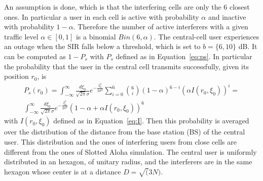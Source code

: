 \documentclass[10pt]{article}
\begin{document}
An assumption is done, which is that the interfering cells are only the 6 closest ones. In particular a user in each cell is active with probability $\alpha$ and inactive with probability $1-\alpha$. Therefore the number of active interferers with a given traffic level $\alpha \in [0,1]$ is a binomial $Bin(6, \alpha)$. The central-cell user experiences an outage when the SIR falls below a threshold, which is set to $b = \{6, 10\}$ dB. It can be computed as $1 - P_{s}$ with $P_{s}$ defined as in Equation~\eqref{eq:ps}. In particular the probability that the user in the central cell transmits successfully, given its position $r_0$, is 
\begin{eqnarray}
  P_s(r_0) = \int_{-\infty}^{\infty} \frac{d\xi_0}{\sqrt{2\pi}\sigma} e^{-\frac{\xi_0^2}{2\sigma^2}} 
  \sum_{i = 0}^{6} \binom{6}{i} (1 - \alpha)^{6-i} \left(\alpha I(r_0, \xi_0) \right)^{i} = \\
  \int_{-\infty}^{\infty} \frac{d\xi_0}{\sqrt{2\pi}\sigma} e^{-\frac{\xi_0^2}{2\sigma^2}} (1 - \alpha + \alpha I(r_0, \xi_0))^6
  \label{eq:succ_cell}
\end{eqnarray}
with $I(r_0, \xi_0)$ defined as in Equation~\eqref{eq:I}. Then this probability is averaged over the distribution of the distance from the base station (BS) of the central user. This distribution and the ones of interfering users from close cells are different from the ones of Slotted Aloha simulation. The central user is uniformly distributed in an hexagon, of unitary radius, and the interferers are in the same hexagon whose center is at a distance $D = \sqrt(3N)$. 
\end{document}
